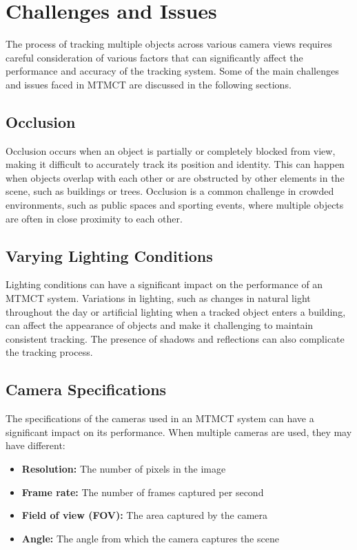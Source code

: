 \section{Challenges and Issues}\label{sec:challenges_and_issues}
The process of tracking multiple objects across various camera views requires careful consideration of various factors that can significantly affect the performance and accuracy of the tracking system. Some of the main challenges and issues faced in MTMCT are discussed in the following sections.

\subsection{Occlusion}\label{subsec:occlusion}
Occlusion occurs when an object is partially or completely blocked from view, making it difficult to accurately track its position and identity. This can happen when objects overlap with each other or are obstructed by other elements in the scene, such as buildings or trees. Occlusion is a common challenge in crowded environments, such as public spaces and sporting events, where multiple objects are often in close proximity to each other.

\subsection{Varying Lighting Conditions}\label{subsec:varying_lighting_conditions}
Lighting conditions can have a significant impact on the performance of an MTMCT system. Variations in lighting, such as changes in natural light throughout the day or artificial lighting when a tracked object enters a building, can affect the appearance of objects and make it challenging to maintain consistent tracking. The presence of shadows and reflections can also complicate the tracking process.

\subsection{Camera Specifications}\label{subsec:camera_specification}
The specifications of the cameras used in an MTMCT system can have a significant impact on its performance. When multiple cameras are used, they may have different:

\begin{itemize}
    \item \textbf{Resolution:} The number of pixels in the image
    \item \textbf{Frame rate:} The number of frames captured per second
    \item \textbf{Field of view (FOV):} The area captured by the camera
    \item \textbf{Angle:} The angle from which the camera captures the scene
\end{itemize}

